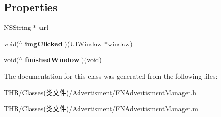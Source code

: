 \subsection*{Properties}
\begin{DoxyCompactItemize}
\item 
\mbox{\label{interface_f_n_advertisment_manager_a01f04c722939a127ad5f7923bc594060}} 
N\+S\+String $\ast$ {\bfseries url}
\item 
\mbox{\label{interface_f_n_advertisment_manager_a0ebdcbaecd68eee6be370388ec588228}} 
void($^\wedge$ {\bfseries img\+Clicked} )(U\+I\+Window $\ast$window)
\item 
\mbox{\label{interface_f_n_advertisment_manager_aff9deb1d950b2b12ce4f07916343e5c8}} 
void($^\wedge$ {\bfseries finished\+Window} )(void)
\end{DoxyCompactItemize}


The documentation for this class was generated from the following files\+:\begin{DoxyCompactItemize}
\item 
T\+H\+B/\+Classes(类文件)/\+Advertisment/F\+N\+Advertisment\+Manager.\+h\item 
T\+H\+B/\+Classes(类文件)/\+Advertisment/F\+N\+Advertisment\+Manager.\+m\end{DoxyCompactItemize}
